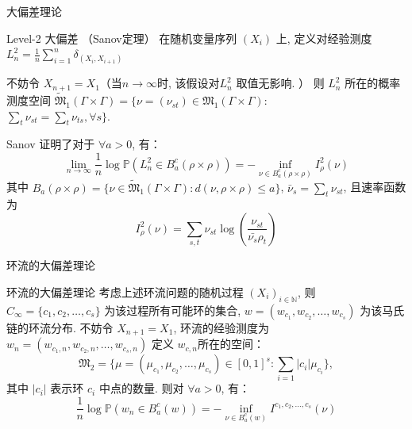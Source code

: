 \documentclass{beamer}
\begin{document}
	\begin{frame}{大偏差理论}
		\begin{block}{Level-2 大偏差 （Sanov定理）}
			在随机变量序列 $(\mathit{X}_i)$ 上, 定义对经验测度
			$\mathit{L}_n^2 = \frac{1}{n} \sum_{i=1}^n \delta_{(\mathit{X}_i, \mathit{X}_{i+1})}$
			
			不妨令 $\mathit{X}_{n+1} = \mathit{X}_1$（当$n\rightarrow \infty$时, 该假设对$\mathit{L}_n^2$ 取值无影响. ）
			则 $\mathit{L}_n^2$ 所在的概率测度空间
			$\widetilde{\mathfrak{M}}_1(\Gamma \times \Gamma) = \{\nu=(\nu_{st}) \in \mathfrak{M}_1(\Gamma \times \Gamma):$ \\$ \sum_{t} \nu_{st} = \sum_{t} \nu_{ts}, \forall s\}.$
		
			Sanov 证明了对于 $\forall a > 0$, 有：
			$$
			\lim_{n \rightarrow \infty} \frac{1}{n} \log \mathbb{P}(\mathit{L}_n^2 \in B_a^c(\rho \times \rho))
			= - \inf_{\nu \in B_a^c(\rho \times \rho)} \mathit{I}_{\rho}^2(\nu)
			$$
			其中 $B_a(\rho \times \rho) = \{\nu \in \widetilde{\mathfrak{M}}_1(\Gamma \times \Gamma): d(\nu, \rho \times \rho) \le a\}$, $\bar{\nu}_s = \sum_t \nu_{st}$, 且速率函数为
			$$
			\mathit{I}_{\rho}^2(\nu) = \sum_{s,t} \nu_{st} \log\left(\frac{\nu_{st}}{\bar{\nu_s}\rho_t}\right)
			$$
		\end{block} 
	\end{frame}

	\begin{frame}{环流的大偏差理论}
		\begin{block}{环流的大偏差理论}
			考虑上述环流问题的随机过程 $(\mathit{X}_i)_{i\in \mathbb{N}}$, 则 $C_{\infty}=\{c_1, c_2, \dots, c_s\}$ 为该过程所有可能环的集合, $\mathit{w} = \left(\mathit{w}_{c_1}, \mathit{w}_{c_2}, \dots, \mathit{w}_{c_s}\right)$ 为该马氏链的环流分布. 不妨令 $\mathit{X}_{n+1} = \mathit{X}_1$, 环流的经验测度为 $\mathit{w}_n = \left(\mathit{w}_{c_1, n}, \mathit{w}_{c_2, n}, \dots, \mathit{w}_{c_s, n}\right)$
			定义 $\mathit{w}_{c, n}$所在的空间：
			$$
			\mathfrak{M}_2 = \{\mu=\left(\mu_{c_1}, \mu_{c_2}, \dots, \mu_{c_s}\right)\in \left[0, 1\right]^s: \sum_{i=1} |c_i| \mu_{c_i}\}, 
			$$
			其中 $|c_i|$ 表示环 $c_i$ 中点的数量. 
			则对 $\forall a >0$, 有：
			$$
			\frac{1}{n} \log \mathbb{P} \left(\mathit{w}_n \in B_a^c(\mathit{w})\right) = - \inf_{\nu \in B_a^c(\mathit{w})} \mathit{I}^{c_1, c_2, \dots, c_s}(\nu)
			$$
		\end{block}
	\end{frame}
\end{document}
